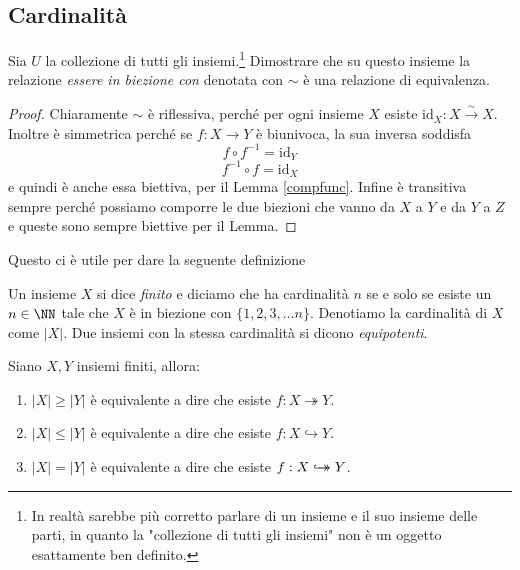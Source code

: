 \documentclass[11pt]{scrartcl}
\newcommand{\inj}{\hookrightarrow}
\newcommand{\surj}{\twoheadrightarrow}
\newcommand{\bij}{\hookrightarrow\mathrel{\mspace{-15mu}}\rightarrow}
\begin{document}
	
	\subsection{Cardinalità}
	\begin{example}
		Sia $U$ la collezione di tutti gli insiemi.\footnote{In realtà sarebbe più corretto parlare di un insieme e il suo insieme delle parti, in quanto la "collezione di tutti gli insiemi" non è un oggetto esattamente ben definito.} Dimostrare che su questo insieme la relazione \textit{essere in biezione con} denotata con $\sim$ è una relazione di equivalenza.
	\end{example}
	
	\begin{proof}
		Chiaramente $\sim$ è riflessiva, perché per ogni insieme $X$ esiste $\text{id}_X:X\xrightarrow{\sim}X$. 
		Inoltre è simmetrica perché se $f:X\to Y$ è biunivoca, la sua inversa soddisfa $$f\circ f^{-1} = \text{id}_Y$$
		$$f^{-1}\circ f = \text{id}_X$$
		e quindi è anche essa biettiva, per il Lemma \ref{compfunc}. Infine è transitiva sempre perché possiamo comporre le due biezioni che vanno da $X$ a $Y$ e da $Y$ a $Z$ e queste sono sempre biettive per il Lemma.
	\end{proof}
	
	Questo ci è utile per dare la seguente definizione
	
	\begin{definition}
		Un insieme $X$ si dice \textit{finito} e diciamo che ha cardinalità $n$ se e solo se esiste un $n\in\NN$ tale che $X$ è in biezione con $\{1,2,3,\dots n\}$. Denotiamo la cardinalità di $X$ come $|X|$. Due insiemi con la stessa cardinalità si dicono \textit{equipotenti}.
	\end{definition}
	
	\begin{lemma}
		\label{eq-card}
		Siano $X,Y$ insiemi finiti, allora:
		\begin{enumerate}
			\item[(i)] $|X|\ge |Y|$ è equivalente a dire che esiste $f:X\surj Y$.
			\item[(ii)] $|X|\le |Y|$ è equivalente a dire che esiste $f:X\inj  Y$.
			\item[(iii)] $|X|=|Y|$ è equivalente a dire che esiste $f:X\bij Y$.
		\end{enumerate}
	\end{lemma}
	
\end{document}
